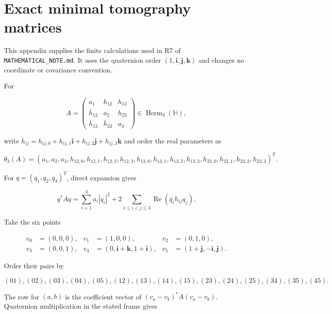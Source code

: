 \documentclass[
  11pt,
]{article}
\begin{document}
\section{Exact minimal tomography
matrices}\label{exact-minimal-tomography-matrices}

This appendix supplies the finite calculations used in R7 of
\texttt{MATHEMATICAL\_NOTE.md}. It uses the quaternion order
\((1,\mathbf i,\mathbf j,\mathbf k)\) and changes no coordinate or
covariance convention.

For

\[
A=\begin{pmatrix}
a_1&h_{12}&h_{13}\\
\bar h_{12}&a_2&h_{23}\\
\bar h_{13}&\bar h_{23}&a_3
\end{pmatrix}\in\operatorname{Herm}_3(\mathbb H),
\]

write
\(h_{ij}=h_{ij,0}+h_{ij,1}\mathbf i+h_{ij,2}\mathbf j+h_{ij,3}\mathbf k\)
and order the real parameters as

\[
\theta_3(A)=(a_1,a_2,a_3,h_{12,0},h_{12,1},h_{12,2},h_{12,3},
h_{13,0},h_{13,1},h_{13,2},h_{13,3},
h_{23,0},h_{23,1},h_{23,2},h_{23,3})^T.
\]

For \(q=(q_1,q_2,q_3)^T\), direct expansion gives

\[
q^*Aq=\sum_{i=1}^3 a_i|q_i|^2
+2\sum_{1\le i<j\le3}\operatorname{Re}(\bar q_i h_{ij}q_j).
\]

Take the six points

\[
\begin{aligned}
v_0&=(0,0,0),&v_1&=(1,0,0),&v_2&=(0,1,0),\\
v_3&=(0,0,1),&v_4&=(0,\mathbf i+\mathbf k,1+\mathbf i),
&v_5&=(1+\mathbf j,-\mathbf i,\mathbf j).
\end{aligned}
\]

Order their pairs by

\[
(01),(02),(03),(04),(05),(12),(13),(14),(15),(23),(24),(25),(34),(35),(45).
\]

The row for \((a,b)\) is the coefficient vector of
\((v_a-v_b)^*A(v_a-v_b)\). Quaternion multiplication in the stated frame
gives
\end{document}

